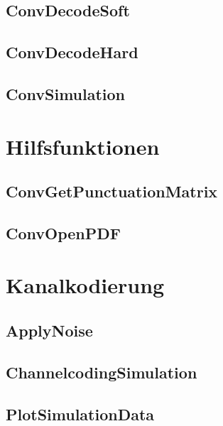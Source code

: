 \subsection{ConvDecodeSoft}


\subsection{ConvDecodeHard}


\subsection{ConvSimulation}


\section{Hilfsfunktionen}
\label{kapitel:interface_hilfsfunktionen}

\subsection{ConvGetPunctuationMatrix}


\subsection{ConvOpenPDF}


\section{Kanalkodierung}
\label{kapitel:interface_kanalkodierung}

\subsection{ApplyNoise}


\subsection{ChannelcodingSimulation}


\subsection{PlotSimulationData}
